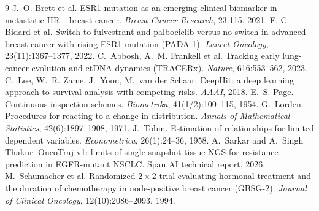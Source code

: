 \documentclass[11pt]{article}
\newcommand{\1}{\mathbf{1}}
\begin{document}
\small
\begin{thebibliography}{9}
 J.~O. Brett et al.
\newblock ESR1 mutation as an emerging clinical biomarker in metastatic HR+ breast cancer.
\newblock \emph{Breast Cancer Research}, 23:115, 2021.
 F.-C. Bidard et al.
\newblock Switch to fulvestrant and palbociclib versus no switch in advanced breast cancer with rising ESR1 mutation (PADA-1).
\newblock \emph{Lancet Oncology}, 23(11):1367--1377, 2022.
 C.~Abbosh, A.~M. Frankell et al.
\newblock Tracking early lung-cancer evolution and ctDNA dynamics (TRACERx).
\newblock \emph{Nature}, 616:553--562, 2023.
 C.~Lee, W.~R. Zame, J.~Yoon, M.~van der Schaar.
\newblock DeepHit: a deep learning approach to survival analysis with competing risks.
\newblock \emph{AAAI}, 2018.
 E.~S. Page.
\newblock Continuous inspection schemes.
\newblock \emph{Biometrika}, 41(1/2):100--115, 1954.
 G.~Lorden.
\newblock Procedures for reacting to a change in distribution.
\newblock \emph{Annals of Mathematical Statistics}, 42(6):1897--1908, 1971.
 J.~Tobin.
\newblock Estimation of relationships for limited dependent variables.
\newblock \emph{Econometrica}, 26(1):24--36, 1958.
 A.~Sarkar and A.~Singh Thakur.
\newblock OncoTraj v1: limits of single-snapshot tissue NGS for resistance prediction in EGFR-mutant NSCLC.
\newblock Span AI technical report, 2026.
 M.~Schumacher et al.
\newblock Randomized $2\times2$ trial evaluating hormonal treatment and the duration of chemotherapy in node-positive breast cancer (GBSG-2).
\newblock \emph{Journal of Clinical Oncology}, 12(10):2086--2093, 1994.
\end{thebibliography}
\end{document}
